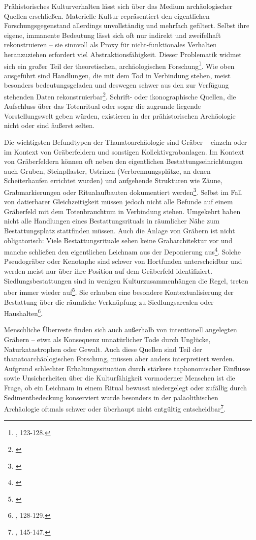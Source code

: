 \documentclass[openany,twoside,twocolumn]{book}
\let\rmarkdownfootnote\footnote%
\def\footnote{\protect\rmarkdownfootnote}
\begin{document}
Prähistorisches Kulturverhalten lässt sich über das Medium archäologischer Quellen erschließen. Materielle Kultur repräsentiert den eigentlichen Forschungsgegenstand allerdings unvollständig und mehrfach gefiltert. Selbst ihre eigene, immanente Bedeutung lässt sich oft nur indirekt und zweifelhaft rekonstruieren -- sie sinnvoll als Proxy für nicht-funktionales Verhalten heranzuziehen erfordert viel Abstraktionsfähigkeit. Dieser Problematik widmet sich ein großer Teil der theoretischen, archäologischen Forschung\footnote{\textcite{hofmann_rituelle_2008}, 123-128.}. Wie oben ausgeführt sind Handlungen, die mit dem Tod in Verbindung stehen, meist besonders bedeutungsgeladen und deswegen schwer aus den zur Verfügung stehenden Daten rekonstruierbar\footnote{\textcite{harke_nature_1997}}. Schrift- oder ikonographische Quellen, die Aufschluss über das Totenritual oder sogar die zugrunde liegende Vorstellungswelt geben würden, existieren in der prähistorischen Archäologie nicht oder sind äußerst selten.

Die wichtigsten Befundtypen der Thanatoarchäologie sind Gräber -- einzeln oder im Kontext von Gräberfeldern und sonstigen Kollektivgrabanlagen. Im Kontext von Gräberfeldern können oft neben den eigentlichen Bestattungseinrichtungen auch Gruben, Steinpflaster, Ustrinen (Verbrennungsplätze, an denen Scheiterhaufen errichtet wurden) und aufgehende Strukturen wie Zäune, Grabmarkierungen oder Ritualaufbauten dokumentiert werden\footnote{\textcite{fischer_vom_1996}}. Selbst im Fall von datierbarer Gleichzeitigkeit müssen jedoch nicht alle Befunde auf einem Gräberfeld mit dem Totenbrauchtum in Verbindung stehen. Umgekehrt haben nicht alle Handlungen eines Bestattungsrituals in räumlicher Nähe zum Bestattungsplatz stattfinden müssen. Auch die Anlage von Gräbern ist nicht obligatorisch: Viele Bestattungsrituale sehen keine Grabarchitektur vor und manche schließen den eigentlichen Leichnam aus der Deponierung aus\footnote{\textcite{hausler_zur_1975}}. Solche Pseudogräber oder Kenotaphe sind schwer von Hortfunden unterscheidbar und werden meist nur über ihre Position auf dem Gräberfeld identifiziert. Siedlungsbestattungen sind in wenigen Kulturzusammenhängen die Regel, treten aber immer wieder auf\footnote{\textcite{veit_studien_1998}}. Sie erlauben eine besondere Kontextualisierung der Bestattung über die räumliche Verknüpfung zu Siedlungsarealen oder Haushalten\footnote{\textcite{hofmann_rituelle_2008}, 128-129.}.

Menschliche Überreste finden sich auch außerhalb von intentionell angelegten Gräbern -- etwa als Konsequenz unnatürlicher Tode durch Unglücke, Naturkatastrophen oder Gewalt. Auch diese Quellen sind Teil der thanatoarchäologischen Forschung, müssen aber anders interpretiert werden. Aufgrund schlechter Erhaltungssituation durch stärkere taphonomischer Einflüsse sowie Unsicherheiten über die Kulturfähigkeit vormoderner Menschen ist die Frage, ob ein Leichnam in einem Ritual bewusst niedergelegt oder zufällig durch Sedimentbedeckung konserviert wurde besonders in der paläolithischen Archäologie oftmals schwer oder überhaupt nicht entgültig entscheidbar\footnote{\textcite{hofmann_rituelle_2008}, 145-147.}.
\end{document}
